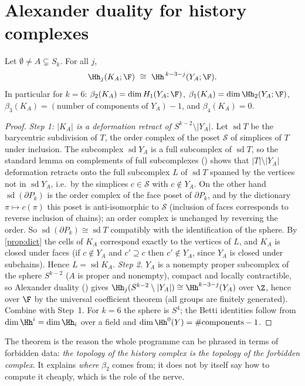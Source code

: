 \section{Alexander duality for history complexes}
\begin{theorem}\label{thm:AD}
Let $\emptyset\ne A\subsetneq S_k$. For all $j$,
\[
\Hh_j(K_A;\F)\ \cong\ \Hh^{\,k-3-j}(Y_A;\F).
\]
In particular for $k=6$: $\beta_2(K_A)=\dim H_1(Y_A;\F)$, $\beta_1(K_A)=\dim\Hh_2(Y_A;\F)$, $\beta_3(K_A)=(\text{number of components of }Y_A)-1$, and $\beta_4(K_A)=0$.
\end{theorem}
\begin{proof}
\emph{Step 1: $|K_A|$ is a deformation retract of $S^{k-2}\setminus|Y_A|$.} Let $\operatorname{sd}T$ be the barycentric subdivision of $T$, the order complex of the poset $\mathcal S$ of simplices of $T$ under inclusion. The subcomplex $\operatorname{sd}Y_A$ is a full subcomplex of $\operatorname{sd}T$, so the standard lemma on complements of full subcomplexes (\cite[\S70]{Munkres}) shows that $|T|\setminus|Y_A|$ deformation retracts onto the full subcomplex $L$ of $\operatorname{sd}T$ spanned by the vertices not in $\operatorname{sd}Y_A$, i.e.\ by the simplices $c\in\mathcal S$ with $c\notin Y_A$. On the other hand $\operatorname{sd}(\partial P_k)$ is the order complex of the face poset of $\partial P_k$, and by the dictionary $\pi\mapsto c(\pi)$ this poset is anti-isomorphic to $\mathcal S$ (inclusion of faces corresponds to reverse inclusion of chains); an order complex is unchanged by reversing the order. So $\operatorname{sd}(\partial P_k)\cong\operatorname{sd}T$ compatibly with the identification of the sphere. By \cref{prop:dict} the cells of $K_A$ correspond exactly to the vertices of $L$, and $K_A$ is closed under faces (if $c\notin Y_A$ and $c'\supseteq c$ then $c'\notin Y_A$, since $Y_A$ is closed under subchains). Hence $L=\operatorname{sd}K_A$.
\emph{Step 2.} $Y_A$ is a nonempty proper subcomplex of the sphere $S^{k-2}$ ($A$ is proper and nonempty), compact and locally contractible, so Alexander duality (\cite[Thm.~3.44]{Hatcher}) gives $\Hh_j(S^{k-2}\setminus|Y_A|)\cong\Hh^{k-3-j}(Y_A)$ over $\Z$, hence over $\F$ by the universal coefficient theorem (all groups are finitely generated). Combine with Step~1. For $k=6$ the sphere is $S^4$; the Betti identities follow from $\dim\Hh^i=\dim\Hh_i$ over a field and $\dim\Hh^0(Y)=\#\mathrm{components}-1$.
\end{proof}
The theorem is the reason the whole programme can be phrased in terms of forbidden data: \emph{the topology of the history complex is the topology of the forbidden complex}. It explains \emph{where} $\beta_2$ comes from; it does not by itself say how to compute it cheaply, which is the role of the nerve.

